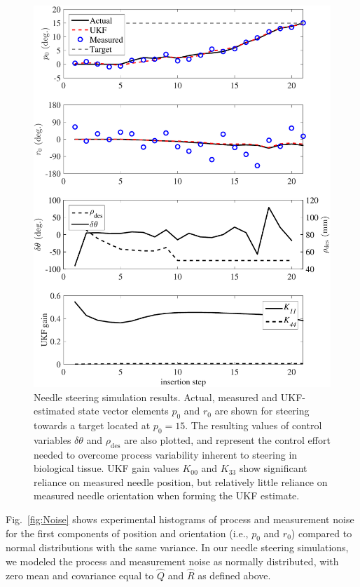 \begin{figure}[!h]
\centering
\includegraphics[width=0.8\columnwidth]{Images/Chapter4/SimulationResults/SimulationResults}%
\caption[Needle steering simulation results with UKF.]{Needle steering simulation results. Actual, measured and UKF-estimated state vector elements $p_0$ and $r_0$ are shown for steering towards a target located at $p_0 = 15$. The resulting values of control variables $\delta\theta$ and $\rho_\text{des}$ are also plotted, and represent the control effort needed to overcome process variability inherent to steering in biological tissue. UKF gain values $K_{00}$ and $K_{33}$ show significant reliance on measured needle position, but relatively little reliance on measured needle orientation when forming the UKF estimate. }
\label{fig:SimulationResults}
\end{figure}   

Fig.~\ref{fig:Noise} shows experimental histograms of process and measurement noise for the first components of position and orientation (i.e., $p_0$ and $r_0$) compared to normal distributions with the same variance. In our needle steering simulations, we modeled the process and measurement noise as normally distributed, with zero mean and covariance equal to ${\hat{Q}}$ and ${\hat{R}}$ as defined above.

